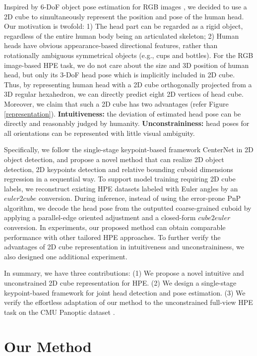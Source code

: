 \documentclass{article}
\begin{document}
Inspired by 6-DoF object pose estimation for RGB images \cite{tekin2018real, ahmadyan2021objectron, sun2022onepose}, we decided to use a 2D cube to simultaneously represent the position and pose of the human head. Our motivation is twofold: 1) The head part can be regarded as a rigid object, regardless of the entire human body being an articulated skeleton; 2) Human heads have obvious appearance-based directional features, rather than rotationally ambiguous symmetrical objects (e.g., cups and bottles). For the RGB image-based HPE task, we do not care about the size and 3D position of human head, but only its 3-DoF head pose which is implicitly included in 2D cube. Thus, by representing human head with a 2D cube orthogonally projected from a 3D regular hexahedron, we can directly predict eight 2D vertices of head cube. Moreover, we claim that such a 2D cube has two advantages (refer Figure \ref{representation}). {\bf Intuitiveness:} the deviation of estimated head pose can be directly and reasonably judged by humanity. {\bf Unconstraininess:} head poses for all orientations can be represented with little visual ambiguity. 

Specifically, we follow the single-stage keypoint-based framework CenterNet \cite{zhou2019objects} in 2D object detection, and propose a novel method that can realize 2D object detection, 2D keypoints detection and relative bounding cuboid dimensions regression in a sequential way. To support model training requiring 2D cube labels, we reconstruct existing HPE datasets labeled with Euler angles by an $euler2cube$ conversion. During inference, instead of using the error-prone PnP algorithm, we decode the head pose from the outputted coarse-grained cuboid by applying a parallel-edge oriented adjustment and a closed-form $cube2euler$ conversion. In experiments, our proposed method can obtain comparable performance with other tailored HPE approaches. To further verify the advantages of 2D cube representation in intuitiveness and unconstraininess, we also designed one additional experiment.

In summary, we have three contributions: (1) We propose a novel intuitive and unconstrained 2D cube representation for HPE. (2) We design a single-stage keypoint-based framework for joint head detection and pose estimation. (3) We verify the effortless adaptation of our method to the unconstrained full-view HPE task on the CMU Panoptic dataset \cite{joo2015panoptic}.



\section{Our Method}
\end{document}
